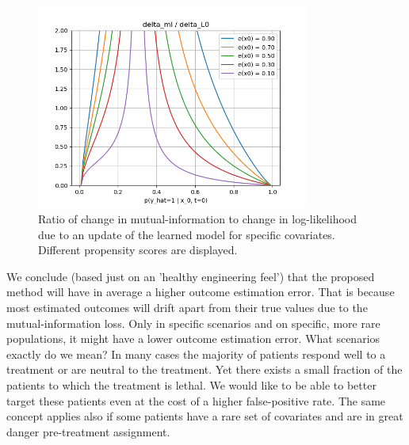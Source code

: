 \documentclass[oneside,12pt]{article}
\begin{document}
%
\begin{figure}
    \centering
        \includegraphics[width=0.8\textwidth]{./deltaLl_vs_deltaMi}
        \caption{\label{fig:deltaLl_vs_deltaMi}Ratio of change in mutual-information to change in log-likelihood due to an update of the learned model for specific covariates. Different propensity scores are displayed.}
\end{figure}
%
We conclude (based just on an 'healthy engineering feel') that the proposed method will have in average a higher outcome estimation error. That is because most estimated outcomes will drift apart from their true values due to the mutual-information loss. Only in specific scenarios and on specific, more rare populations, it might have a lower outcome estimation error. What scenarios exactly do we mean? In many cases the majority of patients respond well to a treatment or are neutral to the treatment. Yet there exists a small fraction of the patients to which the treatment is lethal. We would like to be able to better target these patients even at the cost of a higher false-positive rate. The same concept applies also if some patients have a rare set of covariates and are in great danger pre-treatment assignment. 
%
\end{document}
